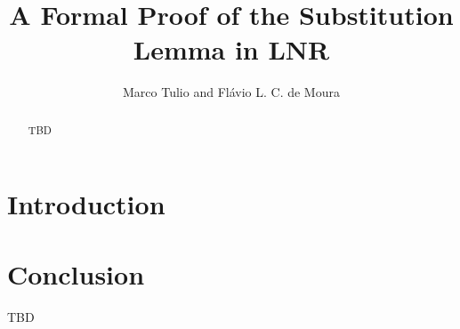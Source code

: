 \documentclass{llncs}
\title{A Formal Proof of the Substitution Lemma in LNR}
\author{Marco Tulio and Flávio L. C. de Moura}
\institute{Universidade de Brasília}
\begin{document}
\maketitle

\begin{abstract}
  TBD
\end{abstract}

\section{Introduction}

 

\section{Conclusion}

TBD



\end{document}
